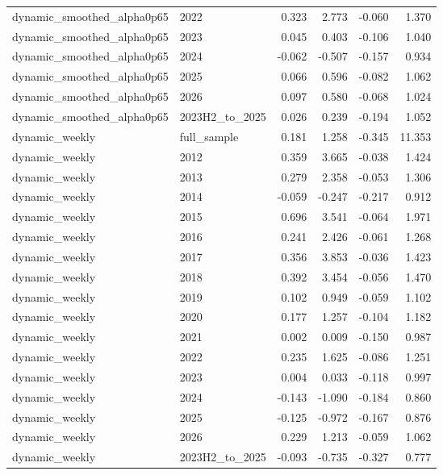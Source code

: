 \begin{longtable}{llrrrr}
dynamic\_smoothed\_alpha0p65 & 2022 & 0.323 & 2.773 & -0.060 & 1.370 \\
dynamic\_smoothed\_alpha0p65 & 2023 & 0.045 & 0.403 & -0.106 & 1.040 \\
dynamic\_smoothed\_alpha0p65 & 2024 & -0.062 & -0.507 & -0.157 & 0.934 \\
dynamic\_smoothed\_alpha0p65 & 2025 & 0.066 & 0.596 & -0.082 & 1.062 \\
dynamic\_smoothed\_alpha0p65 & 2026 & 0.097 & 0.580 & -0.068 & 1.024 \\
dynamic\_smoothed\_alpha0p65 & 2023H2\_to\_2025 & 0.026 & 0.239 & -0.194 & 1.052 \\
dynamic\_weekly & full\_sample & 0.181 & 1.258 & -0.345 & 11.353 \\
dynamic\_weekly & 2012 & 0.359 & 3.665 & -0.038 & 1.424 \\
dynamic\_weekly & 2013 & 0.279 & 2.358 & -0.053 & 1.306 \\
dynamic\_weekly & 2014 & -0.059 & -0.247 & -0.217 & 0.912 \\
dynamic\_weekly & 2015 & 0.696 & 3.541 & -0.064 & 1.971 \\
dynamic\_weekly & 2016 & 0.241 & 2.426 & -0.061 & 1.268 \\
dynamic\_weekly & 2017 & 0.356 & 3.853 & -0.036 & 1.423 \\
dynamic\_weekly & 2018 & 0.392 & 3.454 & -0.056 & 1.470 \\
dynamic\_weekly & 2019 & 0.102 & 0.949 & -0.059 & 1.102 \\
dynamic\_weekly & 2020 & 0.177 & 1.257 & -0.104 & 1.182 \\
dynamic\_weekly & 2021 & 0.002 & 0.009 & -0.150 & 0.987 \\
dynamic\_weekly & 2022 & 0.235 & 1.625 & -0.086 & 1.251 \\
dynamic\_weekly & 2023 & 0.004 & 0.033 & -0.118 & 0.997 \\
dynamic\_weekly & 2024 & -0.143 & -1.090 & -0.184 & 0.860 \\
dynamic\_weekly & 2025 & -0.125 & -0.972 & -0.167 & 0.876 \\
dynamic\_weekly & 2026 & 0.229 & 1.213 & -0.059 & 1.062 \\
dynamic\_weekly & 2023H2\_to\_2025 & -0.093 & -0.735 & -0.327 & 0.777 \\
\bottomrule
\end{longtable}
\normalsize
